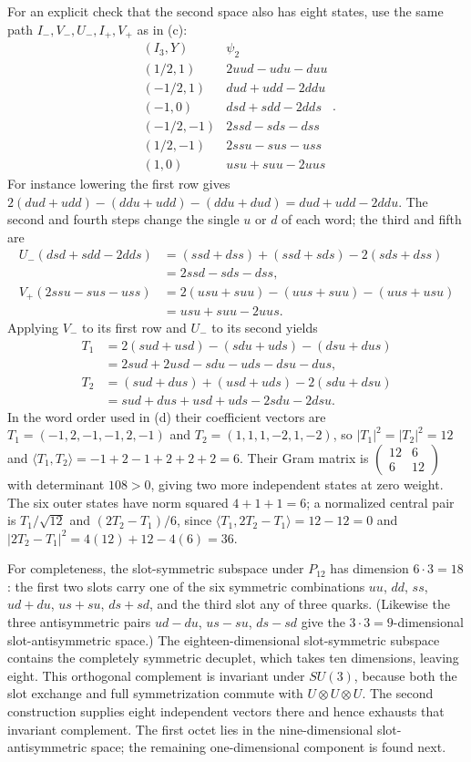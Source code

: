 For an explicit check that the second space also has eight states,
use the same path $I_-,V_-,U_-,I_+,V_+$ as in (c):
\[
\begin{array}{c|l}
(I_3,Y)&\psi_2\\\hline
(1/2,1)&2uud-udu-duu\\
(-1/2,1)&dud+udd-2ddu\\
(-1,0)&dsd+sdd-2dds\\
(-1/2,-1)&2ssd-sds-dss\\
(1/2,-1)&2ssu-sus-uss\\
(1,0)&usu+suu-2uus
\end{array}.
\]
For instance lowering the first row gives
$2(dud+udd)-(ddu+udd)-(ddu+dud)=dud+udd-2ddu$.
The second and fourth steps change the single $u$ or $d$ of each
word; the third and fifth are
\[
\begin{aligned}
U_-(dsd+sdd-2dds)&=(ssd+dss)+(ssd+sds)-2(sds+dss)\\
&=2ssd-sds-dss,\\
V_+(2ssu-sus-uss)&=2(usu+suu)-(uus+suu)-(uus+usu)\\
&=usu+suu-2uus.
\end{aligned}
\]
Applying $V_-$ to its first row and $U_-$ to its second yields
\[
\begin{aligned}
T_1&=2(sud+usd)-(sdu+uds)-(dsu+dus)\\
&=2sud+2usd-sdu-uds-dsu-dus,\\
T_2&=(sud+dus)+(usd+uds)-2(sdu+dsu)\\
&=sud+dus+usd+uds-2sdu-2dsu.
\end{aligned}
\]
In the word order used in (d) their coefficient vectors are
$T_1=(-1,2,-1,-1,2,-1)$ and $T_2=(1,1,1,-2,1,-2)$, so
$|T_1|^2=|T_2|^2=12$ and $\langle T_1,T_2\rangle=-1+2-1+2+2+2=6$.
Their Gram matrix is
$\begin{pmatrix}12&6\\6&12\end{pmatrix}$ with determinant
$108>0$, giving two more independent states at zero weight.
The six outer states have norm squared $4+1+1=6$; a normalized
central pair is $T_1/\sqrt{12}$ and $(2T_2-T_1)/6$, since
$\langle T_1,2T_2-T_1\rangle=12-12=0$ and
$|2T_2-T_1|^2=4(12)+12-4(6)=36$.

For completeness, the slot-symmetric subspace under $P_{12}$
has dimension $6\cdot3=18$: the first two slots carry one of the six
symmetric combinations $uu$, $dd$, $ss$, $ud+du$, $us+su$, $ds+sd$,
and the third slot any of three quarks. (Likewise the three
antisymmetric pairs $ud-du$, $us-su$, $ds-sd$ give the
$3\cdot3=9$-dimensional slot-antisymmetric space.)
The eighteen-dimensional slot-symmetric subspace contains the
completely symmetric decuplet, which takes ten dimensions, leaving
eight. This orthogonal complement
is invariant under $SU(3)$, because both the slot exchange and
full symmetrization commute with $U\otimes U\otimes U$.
The second construction supplies eight independent vectors there
and hence exhausts that invariant complement.
The first octet lies in the nine-dimensional slot-antisymmetric
space; the remaining one-dimensional component is found next.

